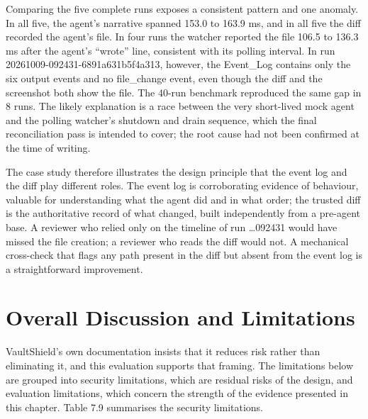 \documentclass[12pt,a4paper,oneside]{report}
\begin{document}
Comparing the five complete runs exposes a consistent pattern and one anomaly. In all five, the agent's narrative spanned 153.0 to 163.9 ms, and in all five the diff recorded the agent's file. In four runs the watcher reported the file 106.5 to 136.3 ms after the agent's ``wrote'' line, consistent with its polling interval. In run 20261009-092431-6891a631b5f4a313, however, the Event\_Log contains only the six output events and no file\_\allowbreak{}change event, even though the diff and the screenshot both show the file. The 40-run benchmark reproduced the same gap in 8 runs. The likely explanation is a race between the very short-lived mock agent and the polling watcher's shutdown and drain sequence, which the final reconciliation pass is intended to cover; the root cause had not been confirmed at the time of writing.

The case study therefore illustrates the design principle that the event log and the diff play different roles. The event log is corroborating evidence of behaviour, valuable for understanding what the agent did and in what order; the trusted diff is the authoritative record of what changed, built independently from a pre-agent base. A reviewer who relied only on the timeline of run …092431 would have missed the file creation; a reviewer who reads the diff would not. A mechanical cross-check that flags any path present in the diff but absent from the event log is a straightforward improvement.

\section{Overall Discussion and Limitations}\label{discussion-and-limitations}

VaultShield's own documentation insists that it reduces risk rather than eliminating it, and this evaluation supports that framing. The limitations below are grouped into security limitations, which are residual risks of the design, and evaluation limitations, which concern the strength of the evidence presented in this chapter. Table 7.9 summarises the security limitations.

\begingroup\small
\end{document}
